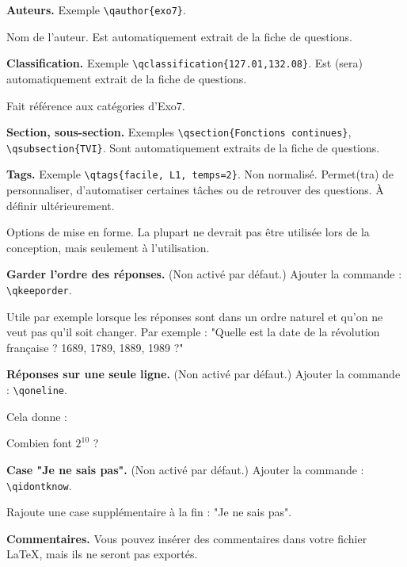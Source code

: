 \documentclass[12pt,a4paper]{article}
\begin{document}
\bigskip
\textbf{Auteurs.} Exemple \verb|\qauthor{exo7}|. 

Nom de l'auteur. Est automatiquement extrait de la fiche de questions.

\bigskip
\textbf{Classification.} Exemple \verb|\qclassification{127.01,132.08}|. Est (sera) automatiquement extrait de la fiche de questions.

Fait référence aux catégories d'Exo7.

\bigskip
\textbf{Section, sous-section.} Exemples \verb|\qsection{Fonctions continues}|, \verb|\qsubsection{TVI}|. Sont  automatiquement extraits de la fiche de questions.


\bigskip
\textbf{Tags.} Exemple \verb|\qtags{facile, L1, temps=2}|. Non normalisé. Permet(tra) de personnaliser, d'automatiser certaines tâches ou de retrouver des questions. À définir ultérieurement.

\bigskip

Options de mise en forme. La plupart ne devrait pas être utilisée lors de la conception, mais seulement à l'utilisation.

\bigskip
\textbf{Garder l'ordre des réponses.} (Non activé par défaut.) Ajouter la commande : \verb|\qkeeporder|. 

Utile par exemple lorsque les réponses sont dans un ordre naturel et qu'on ne veut pas qu'il soit changer. Par exemple : "Quelle est la date de la révolution française ? 1689, 1789, 1889, 1989 ?" 


\bigskip
\textbf{Réponses sur une seule ligne.} (Non activé par défaut.) Ajouter la commande : \verb|\qoneline|.

Cela donne :
\begin{center}
\begin{minipage}{0.8\textwidth}
\begin{question}
\qoneline
Combien font $2^{10}$ ?
\begin{answers}
\end{answers}
\end{question}
\end{minipage}
\end{center}


\bigskip
\textbf{Case "Je ne sais pas".} (Non activé par défaut.) Ajouter la commande : \verb|\qidontknow|. 

Rajoute une case supplémentaire à la fin : "Je ne sais pas".


\bigskip
\textbf{Commentaires.} Vous pouvez insérer des commentaires dans votre fichier \LaTeX, mais ils ne seront pas exportés. 
\end{document}
